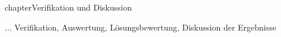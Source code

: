chapter{Verifikation und Diskussion}
\label{cha:Verifikation}

... Verifikation, Auswertung, Lösungsbewertung, Diskussion der Ergebnisse